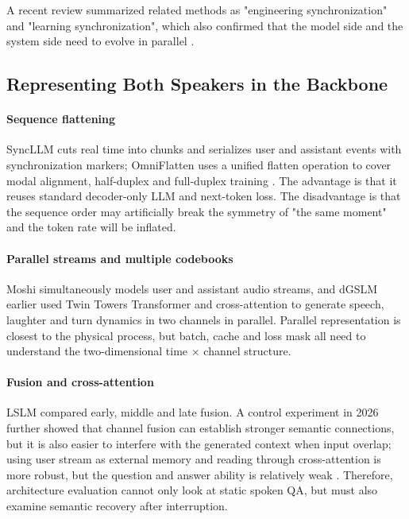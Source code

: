 \documentclass[UTF8,fontset=none,a4paper,10pt]{ctexart}
\begin{document}
A recent review summarized related methods as "engineering synchronization" and "learning synchronization", which also confirmed that the model side and the system side need to evolve in parallel \cite{chen2025survey}.

\subsection{Representing Both Speakers in the Backbone}

\paragraph{Sequence flattening}
SyncLLM cuts real time into chunks and serializes user and assistant events with synchronization markers; OmniFlatten uses a unified flatten operation to cover modal alignment, half-duplex and full-duplex training \cite{veluri2024syncllm,zhang2024omniflatten}. The advantage is that it reuses standard decoder-only LLM and next-token loss. The disadvantage is that the sequence order may artificially break the symmetry of "the same moment" and the token rate will be inflated.

\paragraph{Parallel streams and multiple codebooks}
Moshi simultaneously models user and assistant audio streams, and dGSLM earlier used Twin Towers Transformer and cross-attention to generate speech, laughter and turn dynamics \cite{nguyen2022dgslm,defossez2024moshi} in two channels in parallel. Parallel representation is closest to the physical process, but batch, cache and loss mask all need to understand the two-dimensional time $\times$ channel structure.

\paragraph{Fusion and cross-attention}
LSLM compared early, middle and late fusion. A control experiment in 2026 further showed that channel fusion can establish stronger semantic connections, but it is also easier to interfere with the generated context when input overlap; using user stream as external memory and reading through cross-attention is more robust, but the question and answer ability is relatively weak \cite{ma2025lslm,lu2026routing}. Therefore, architecture evaluation cannot only look at static spoken QA, but must also examine semantic recovery after interruption.
\end{document}
